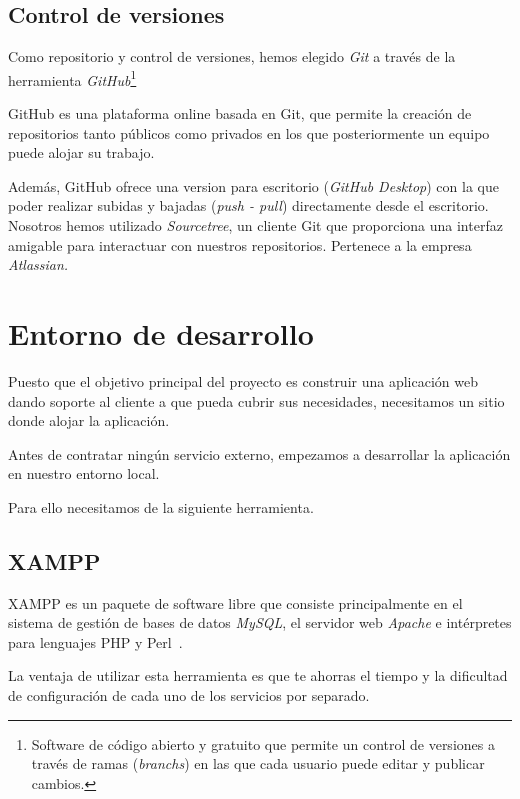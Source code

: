 \subsection{Control de versiones}

Como repositorio y control de versiones, hemos elegido \textit{Git} a través de la herramienta \textit{GitHub}\footnote{Software de código abierto y gratuito que permite un control de versiones a través de ramas (\textit{branchs}) en las que cada usuario puede editar y publicar cambios.}

GitHub es una plataforma online basada en Git, que permite la creación de repositorios tanto públicos como privados en los que posteriormente un equipo puede alojar su trabajo.

Además, GitHub ofrece una version para escritorio (\textit{GitHub Desktop}) con la que poder realizar subidas y bajadas (\textit{push - pull}) directamente desde el escritorio. Nosotros hemos utilizado \textit{Sourcetree}, un cliente Git que proporciona una interfaz amigable para interactuar con nuestros repositorios. Pertenece a la empresa \textit{Atlassian.}

\newpage

\section{Entorno de desarrollo}

Puesto que el objetivo principal del proyecto es construir una aplicación web dando soporte al cliente a que pueda cubrir sus necesidades, necesitamos un sitio donde alojar la aplicación. 

Antes de contratar ningún servicio externo, empezamos a desarrollar la aplicación en nuestro entorno local. 

Para ello necesitamos de la siguiente herramienta.

\subsection{XAMPP}

XAMPP es un paquete de software libre que consiste principalmente en el sistema de gestión de bases de datos \textit{MySQL}, el servidor web \textit{Apache} e intérpretes para lenguajes PHP y Perl~\cite{wiki:xampp}.

La ventaja de utilizar esta herramienta es que te ahorras el tiempo y la dificultad de configuración de cada uno de los servicios por separado. 

